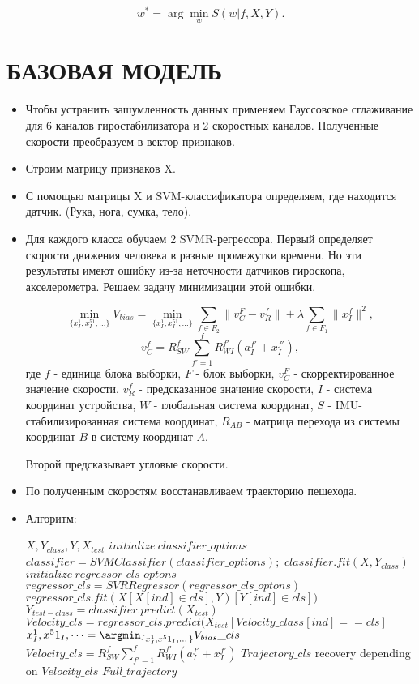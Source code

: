 \documentclass[letterpaper, 10 pt, conference]{ieeeconf}  %
\begin{document}
\[w^* = \arg\min_{w}S(w|f, X, Y).\]


\section{БАЗОВАЯ МОДЕЛЬ}
\begin{itemize}

\item Чтобы устранить зашумленность данных применяем Гауссовское сглаживание для 6 каналов гиростабилизатора и 2 скоростных каналов. Полученные скорости преобразуем в вектор признаков.
\item Строим матрицу признаков X.
\item С помощью матрицы X и SVM-классификатора определяем, где находится датчик. (Рука, нога, сумка, тело).
\item Для каждого класса обучаем 2 SVMR-регрессора. Первый определяет скорости движения человека в разные промежутки времени. Но эти результаты имеют ошибку из-за неточности датчиков гироскопа, акселерометра. Решаем задачу минимизации этой ошибки.

\[\min_{\{x^1_I, x^51_I,\dots\}}V_{bias}=
\min_{\{x^1_I, x^51_I,\dots\}}\sum_{f \in F_2}\|v_C^F-v_R^f\|+
\lambda\sum_{f \in F_1}\|x^f_I\|^2,\]
\[v_C^f = R_{SW}^f\sum_{f'=1}^f R_{WI}^{f'}(a_I^{f'}+x_I^{f'}),\]
где $f$ - единица блока выборки, $F$ - блок выборки, $v_C^F$ - скорректированное значение скорости, $v_R^f$ - предсказанное значение скорости, $I$ - система координат устройства, $W$ - глобальная система координат, $S$ - IMU-стабилизированная система координат, $R_{AB}$ - матрица перехода из системы координат $B$ в систему координат $A$.

Второй предсказывает угловые скорости.

\item По полученным скоростям восстанавливаем траекторию пешехода.
\item Алгоритм:

\begin{algorithmic}[1]
\REQUIRE $X, Y_{class}, Y, X_{test}$
\STATE $initialize ~ classifier\_options$
\STATE $classifier = SVMClassifier(classifier\_options);$
\STATE $classifier.fit(X, Y_{class})$
\STATE $initialize ~ regressor\_cls\_optons$
\STATE $regressor\_cls = SVRRegressor(regressor\_cls\_optons)$
\STATE $regressor\_cls.fit(X[X[ind] \in cls], Y)[Y[ind] \in cls])$
\ENDFOR
\STATE $Y_{test-class} = classifier.predict(X_{test})$
\STATE $Velocity\_cls = regressor\_cls.predict(X_{test} [Velocity\_class[ind] == cls]$
\STATE $x^1_I, x^51_I,\dots = \argmin_{\{x^1_I, x^51_I,\dots\}}V_{bias}\_cls$
\STATE $Velocity\_cls = R_{SW}^f\sum_{f'=1}^f R_{WI}^{f'}(a_I^{f'}+x_I^{f'})$
\STATE $Trajectory\_cls$ recovery depending on $Velocity\_cls$
\ENDFOR
\RETURN $Full\_trajectory$
\end{algorithmic}

\end{itemize}
\end{document}
